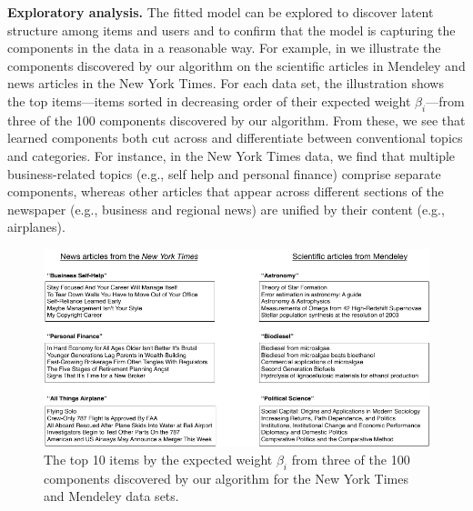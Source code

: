 
{\bf Exploratory analysis.} The fitted model can be explored to
discover latent structure among items and users and to confirm that
the model is capturing the components in the data in a reasonable
way. For example, in  we illustrate the components
discovered by our algorithm on the scientific articles in Mendeley and
news articles in the New York Times. For each data set, the
illustration shows the top items---items sorted in decreasing order of
their expected weight $\beta_i$---from three of the 100 components
discovered by our algorithm. From these, we see that learned
components both cut across and differentiate between conventional
topics and categories. For instance, in the New York Times data, we find
that multiple business-related topics (e.g., self help and personal
finance) comprise separate components, whereas other articles that
appear across different sections of the newspaper (e.g., business and
regional news) are unified by their content (e.g., airplanes). 


\begin{figure}
\centering
\includegraphics[width=\textwidth]{./figures/attributes.pdf}
\caption{The top 10 items by the expected weight $\beta_i$ from three
  of the 100 components discovered by our algorithm for the New York
  Times and Mendeley data sets.}
\label{fig:components}
\end{figure}
